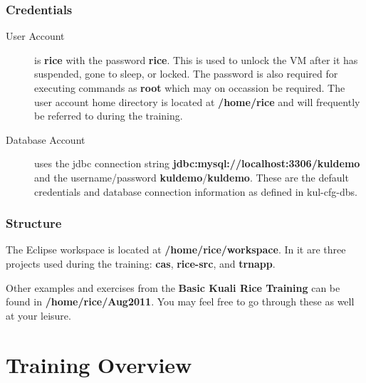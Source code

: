 \documentclass[letterpaper,notitlepage,12pt]{book}
\begin{document}
\subsubsection*{Credentials}
\begin{description}
\item [User Account] is \textbf{rice} with the password
  \textbf{rice}. This is used to unlock the VM after it has suspended,
  gone to sleep, or locked. The password is also required for
  executing commands as \textbf{root} which may on occassion be
  required. The user account home directory is located at
  \textbf{/home/rice} and will frequently be referred to during the training.
\item [Database Account] uses the jdbc connection string
  \textbf{jdbc:mysql://localhost:3306/kuldemo} and the
  username/password \textbf{kuldemo}/\textbf{kuldemo}. These are the
  default credentials and database connection information as defined
  in kul-cfg-dbs.
\end{description}

\subsubsection*{Structure}
The Eclipse workspace is located at \textbf{/home/rice/workspace}. In
it are three projects used during the training: \textbf{cas},
\textbf{rice-src}, and \textbf{trnapp}.

Other examples and exercises from the \textbf{Basic Kuali Rice
  Training} can be found in \textbf{/home/rice/Aug2011}. You may feel
free to go through these as well at your leisure.

\section*{Training Overview}


\end{document}
